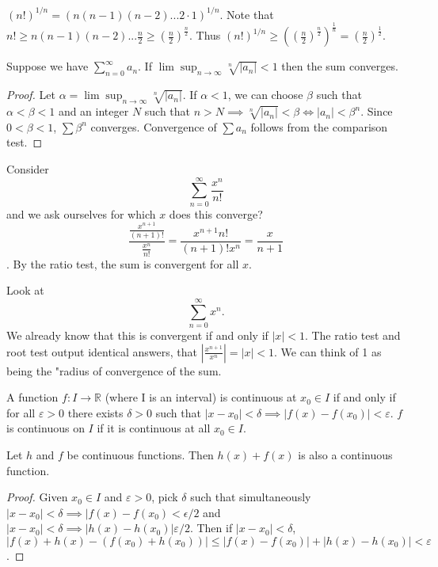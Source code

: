 \documentclass{article}
\newcommand{\R}{\mathbb{R}}
\newcommand{\eps}{\varepsilon}
\newcommand{\ra}[1][]{\xrightarrow{#1}}
\begin{document}
\begin{example}
$(n!)^{1/n}=(n(n-1)(n-2)...2\cdot 1)^{1/n}$. Note that $n!\geq n(n-1)(n-2)...\frac{n}{2}\geq (\frac{n}{2})^{\frac{n}{2}}$. Thus $(n!)^{1/n}\geq ((\frac{n}{2})^\frac{n}{2})^\frac{1}{n}=(\frac{n}{2})^\frac{1}{2}$.
\end{example}
\begin{definition}
Suppose we have $\sum_{n=0}^\infty a_n$. If $\lim\sup_{n\ra\infty}\sqrt[n]{|a_n|}<1$ then the sum converges.
\end{definition}
\begin{proof}
Let $\alpha=\lim\sup_{n\ra\infty}\sqrt[n]{|a_n|}$. If $\alpha<1$, we can choose $\beta$ such that $\alpha<\beta<1$ and an integer $N$ such that $n>N\implies \sqrt[n]{|a_n|}<\beta \iff |a_n|<\beta^n$. Since $0<\beta<1$, $\sum \beta^n$ converges. Convergence of $\sum a_n$ follows from the comparison test.
\end{proof}
\begin{example}
Consider $$\sum_{n=0}^\infty \frac{x^n}{n!}$$ and we ask ourselves for which $x$ does this converge? $$\frac{\frac{x^{n+1}}{(n+1)!}}{\frac{x^n}{n!}}=\frac{x^{n+1}n!}{(n+1)!x^n}=\frac{x}{n+1}$$. By the ratio test, the sum is convergent for all $x$.
\end{example}
\begin{example}
Look at $$\sum_{n=0}^\infty x^n.$$ We already know that this is convergent if and only if $|x|<1$. The ratio test and root test output identical answers, that $|\frac{x^{n+1}}{x^n}|=|x|<1$. We can think of 1 as being the "radius of convergence of the sum.
\end{example}
\begin{definition}
A function $f:I\ra\R$ (where I is an interval) is continuous at $x_0\in I$ if and only if for all $\eps>0$ there exists $\delta>0$ such that $|x-x_0|<\delta\implies|f(x)-f(x_0)|<\eps$. $f$ is continuous on $I$ if it is continuous at all $x_0\in I$.
\end{definition}
\begin{proposition}
Let $h$ and $f$ be continuous functions. Then $h(x)+f(x)$ is also a continuous function.
\end{proposition}
\begin{proof}
Given $x_0\in I$ and $\eps>0$, pick $\delta$ such that simultaneously $|x-x_0|<\delta\implies |f(x)-f(x_0)<\epsilon/2$ and $|x-x_0|<\delta\implies |h(x)-h(x_0)|\eps/2$. Then if $|x-x_0|<\delta$, $|f(x)+h(x)-(f(x_0)+h(x_0))|\leq|f(x)-f(x_0)|+|h(x)-h(x_0)|<\eps$.
\end{proof}
\end{document}
